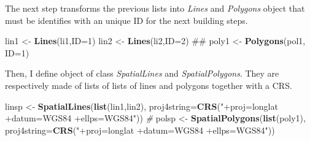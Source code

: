 \documentclass[]{report}
\newenvironment{Shaded}{\begin{snugshade}}{\end{snugshade}}
\newcommand{\KeywordTok}[1]{\textcolor[rgb]{0.13,0.29,0.53}{\textbf{{#1}}}}
\newcommand{\DataTypeTok}[1]{\textcolor[rgb]{0.13,0.29,0.53}{{#1}}}
\newcommand{\DecValTok}[1]{\textcolor[rgb]{0.00,0.00,0.81}{{#1}}}
\newcommand{\StringTok}[1]{\textcolor[rgb]{0.31,0.60,0.02}{{#1}}}
\newcommand{\CommentTok}[1]{\textcolor[rgb]{0.56,0.35,0.01}{\textit{{#1}}}}
\newcommand{\NormalTok}[1]{{#1}}
\begin{document}
\begin{Shaded}
\end{Shaded}

The next step transforms the previous lists into \emph{Lines} and
\emph{Polygons} object that must be identifies with an unique ID for the
next building steps.

\begin{Shaded}
\begin{Highlighting}[]
\NormalTok{lin1 <-}\StringTok{ }\KeywordTok{Lines}\NormalTok{(li1,}\DataTypeTok{ID=}\DecValTok{1}\NormalTok{)}
\NormalTok{lin2 <-}\StringTok{ }\KeywordTok{Lines}\NormalTok{(li2,}\DataTypeTok{ID=}\DecValTok{2}\NormalTok{)}
\NormalTok{##}
\NormalTok{poly1 <-}\StringTok{  }\KeywordTok{Polygons}\NormalTok{(pol1, }\DataTypeTok{ID=}\DecValTok{1}\NormalTok{)}
\end{Highlighting}
\end{Shaded}

Then, I define object of class \emph{SpatialLines} and
\emph{SpatialPolygons}. They are respectively made of lists of lists of
lines and polygons together with a CRS.

\begin{Shaded}
\begin{Highlighting}[]
\NormalTok{linsp <-}\StringTok{ }\KeywordTok{SpatialLines}\NormalTok{(}\KeywordTok{list}\NormalTok{(lin1,lin2),}
    \DataTypeTok{proj4string=}\KeywordTok{CRS}\NormalTok{(}\StringTok{"+proj=longlat +datum=WGS84 +ellps=WGS84"}\NormalTok{))}
\CommentTok{#}
\NormalTok{polsp <-}\StringTok{ }\KeywordTok{SpatialPolygons}\NormalTok{(}\KeywordTok{list}\NormalTok{(poly1),}
    \DataTypeTok{proj4string=}\KeywordTok{CRS}\NormalTok{(}\StringTok{"+proj=longlat +datum=WGS84 +ellps=WGS84"}\NormalTok{))}
\end{Highlighting}
\end{Shaded}
\end{document}
